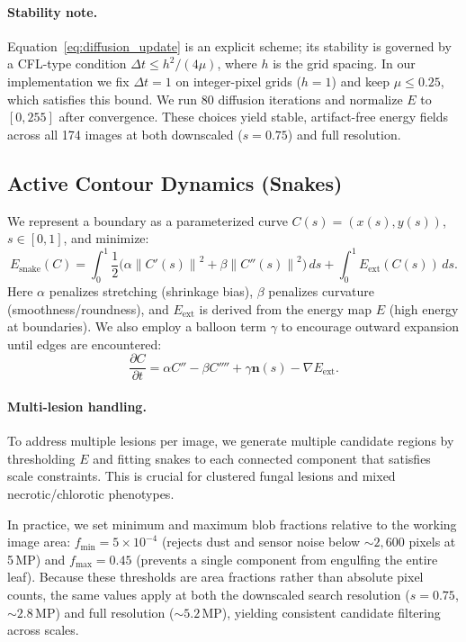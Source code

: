 \documentclass[journal]{IEEEtran}
\newcommand{\grad}{\nabla}
\newcommand{\norm}[1]{\left\lVert #1 \right\rVert}
\begin{document}
\paragraph{Stability note.}
Equation~\eqref{eq:diffusion_update} is an explicit scheme; its stability is governed by a CFL-type condition $\Delta t \leq h^2/(4\mu)$, where $h$ is the grid spacing. In our implementation we fix $\Delta t = 1$ on integer-pixel grids ($h=1$) and keep $\mu\leq 0.25$, which satisfies this bound. We run 80 diffusion iterations and normalize $E$ to $[0,255]$ after convergence. These choices yield stable, artifact-free energy fields across all 174 images at both downscaled ($s{=}0.75$) and full resolution.

\subsection{Active Contour Dynamics (Snakes)}
We represent a boundary as a parameterized curve $C(s) = (x(s), y(s))$, $s\in[0,1]$, and minimize:
\begin{equation}
E_{\mathrm{snake}}(C) = \int_0^1 \frac{1}{2}\Big(\alpha \norm{C'(s)}^2 + \beta \norm{C''(s)}^2\Big)\,ds + \int_0^1 E_{\mathrm{ext}}(C(s))\,ds.
\end{equation}
Here $\alpha$ penalizes stretching (shrinkage bias), $\beta$ penalizes curvature (smoothness/roundness), and $E_{\mathrm{ext}}$ is derived from the energy map $E$ (high energy at boundaries). We also employ a balloon term $\gamma$ to encourage outward expansion until edges are encountered:
\begin{equation}
\frac{\partial C}{\partial t} = \alpha C'' - \beta C'''' + \gamma \mathbf{n}(s) - \grad E_{\mathrm{ext}}.
\end{equation}

\paragraph{Multi-lesion handling.}
To address multiple lesions per image, we generate multiple candidate regions by thresholding $E$ and fitting snakes to each connected component that satisfies scale constraints. This is crucial for clustered fungal lesions and mixed necrotic/chlorotic phenotypes.

In practice, we set minimum and maximum blob fractions relative to the working image area: $f_{\min}=5\times10^{-4}$ (rejects dust and sensor noise below ${\sim}2{,}600$ pixels at 5\,MP) and $f_{\max}=0.45$ (prevents a single component from engulfing the entire leaf). Because these thresholds are area fractions rather than absolute pixel counts, the same values apply at both the downscaled search resolution ($s{=}0.75$, ${\sim}2.8$\,MP) and full resolution (${\sim}5.2$\,MP), yielding consistent candidate filtering across scales.
\end{document}
